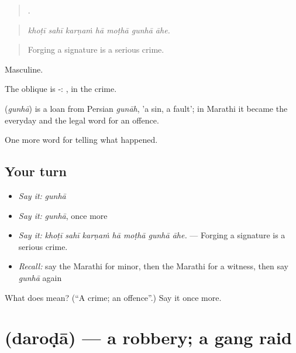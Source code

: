 \begin{quote}
      .
\end{quote}

\begin{quote}
\emph{khoṭī sahī karṇaṁ hā moṭhā gunhā āhe.}
\end{quote}

\begin{quote}
Forging a signature is a serious crime.
\end{quote}

Masculine.

The oblique is -: , in the crime.

\begin{cousinweb}
\textbf{} (\emph{gunhā}) is a loan from Persian \emph{gunāh}, 'a sin, a fault'; in Marathi it became the everyday and the legal word for an offence.
\end{cousinweb}

\begin{grammarlens}[title={What you've built}]
One more word for telling what happened.
\end{grammarlens}

\subsection*{Your turn}
\begin{itemize}
\raggedright
  \item \emph{Say it:} \emph{gunhā}
  \item \emph{Say it:} \emph{gunhā}, once more
  \item \emph{Say it:} \emph{khoṭī sahī karṇaṁ hā moṭhā gunhā āhe.} — Forging a signature is a serious crime.
  \item \emph{Recall:} say the Marathi for minor, then the Marathi for a witness, then say \emph{gunhā} again
\end{itemize}

\begin{tcolorbox}[breakable,colback=teal!4,colframe=teal!35!black,title={Before you move on}]
What does  mean? (\textquotedblleft{}A crime; an offence\textquotedblright{}.) Say it once more.
\end{tcolorbox}
\section[\texorpdfstring{\mr{दरोडा} (daroḍā)}{दरोडा (daroḍā)}]{ (daroḍā) — a robbery; a gang raid}

